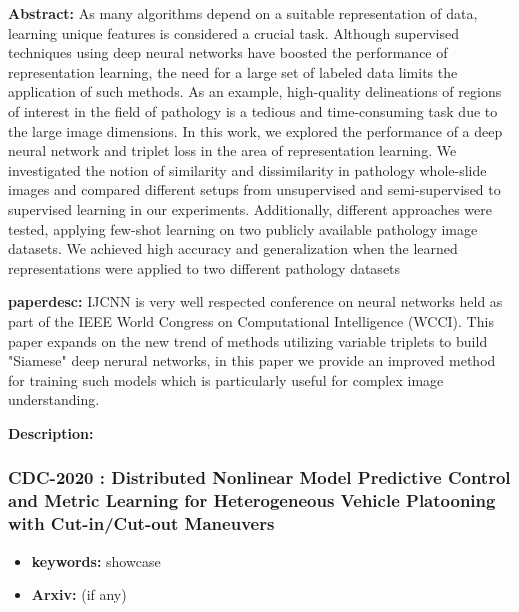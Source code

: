 \documentclass{article}
\begin{document}
\textbf{Abstract:} As many algorithms depend on a suitable representation of data, learning
unique features is considered a crucial task. Although supervised techniques
using deep neural networks have boosted the performance of representation
learning, the need for a large set of labeled data limits the application of
such methods. As an example, high-quality delineations of regions of interest
in the field of pathology is a tedious and time-consuming task due to the large
image dimensions. In this work, we explored the performance of a deep neural
network and triplet loss in the area of representation learning. We
investigated the notion of similarity and dissimilarity in pathology
whole-slide images and compared different setups from unsupervised and
semi-supervised to supervised learning in our experiments. Additionally,
different approaches were tested, applying few-shot learning on two publicly
available pathology image datasets. We achieved high accuracy and
generalization when the learned representations were applied to two different
pathology datasets

\textbf{paperdesc:} IJCNN is very well respected conference on neural networks held as part of the IEEE World Congress on Computational Intelligence (WCCI). This paper expands on the new trend of methods utilizing variable triplets to build "Siamese" deep nerural networks, in this paper we provide an improved method for training such models which is particularly useful for complex image understanding.

\textbf{Description:} 



\newpage
\subsubsection{\textbf{CDC-2020} : Distributed Nonlinear Model Predictive Control and Metric Learning for Heterogeneous Vehicle Platooning with Cut-in/Cut-out Maneuvers}
\begin{itemize}
\item \textbf{keywords:} showcase
\item \textbf{Arxiv:}  (if any)
\end{itemize}

\end{document}
